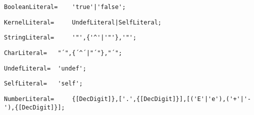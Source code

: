 \documentclass{article}
\begin{document}
    \begin{lstlisting}[mathescape=true]
     BooleanLiteral= 	'true'|'false';
    \end{lstlisting}
    
    \begin{lstlisting}[mathescape=true]
     KernelLiteral= 	UndefLiteral|SelfLiteral;
    \end{lstlisting}
    
    \begin{lstlisting}[mathescape=true]
     StringLiteral= 	'"',{'^'|'"'},'"';
    \end{lstlisting}
    
    \begin{lstlisting}[mathescape=true]
     CharLiteral= 	"´",{´^´|"´"},"´";
    \end{lstlisting}
    
    \begin{lstlisting}[mathescape=true]
     UndefLiteral= 	'undef';
    \end{lstlisting}
    
    \begin{lstlisting}[mathescape=true]
     SelfLiteral= 	'self';
    \end{lstlisting}
    
    \begin{lstlisting}[mathescape=true]
     NumberLiteral= 	{[DecDigit]},['.',{[DecDigit]}],[('E'|'e'),('+'|'-'),{[DecDigit]}];
    \end{lstlisting}
    
\end{document}
